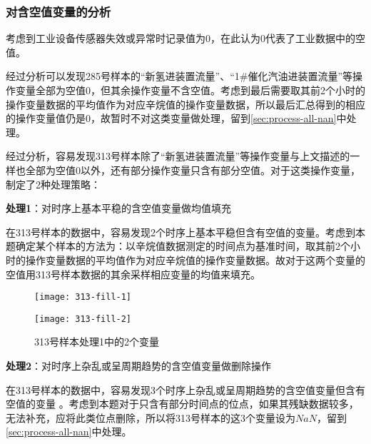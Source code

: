 \documentclass[bwprint]{gmcmthesis}
\begin{document}
%
%


\FloatBarrier
\subsubsection{对含空值变量的分析}\label{sec:empty-analyze}

考虑到工业设备传感器失效或异常时记录值为0，在此认为0代表了工业数据中的空值。

经过分析可以发现285号样本的“新氢进装置流量”、“1\#催化汽油进装置流量”等操作变量全部为空值0，但其余操作变量不含空值。考虑到最后需要取其前2个小时的操作变量数据的平均值作为对应辛烷值的操作变量数据，所以最后汇总得到的相应的操作变量值仍是0，故暂时不对这类变量做处理，留到\ref{sec:process-all-nan}中处理。

经过分析，容易发现313号样本除了“新氢进装置流量”等操作变量与上文描述的一样也全部为空值0以外，还有部分操作变量只含有部分空值。对于这类操作变量，制定了2种处理策略：

\textbf{处理1}：对时序上基本平稳的含空值变量做均值填充

在313号样本的数据中，容易发现2个时序上基本平稳但含有空值的变量。考虑到本题确定某个样本的方法为：以辛烷值数据测定的时间点为基准时间，取其前2个小时的操作变量数据的平均值作为对应辛烷值的操作变量数据。故对于这两个变量的空值用313号样本数据的其余采样相应变量的均值来填充。


\begin{figure}[htb]
    \centering
    \begin{minipage}[c]{0.35\textwidth}
        \centering
        \texttt{[image: 313-fill-1]}
    \end{minipage}
    \begin{minipage}[c]{0.35\textwidth}
        \centering
        \texttt{[image: 313-fill-2]}
    \end{minipage}
    \caption{313号样本处理1中的2个变量}
\end{figure}


\textbf{处理2}：对时序上杂乱或呈周期趋势的含空值变量做删除操作

在313号样本的数据中，容易发现3个时序上杂乱或呈周期趋势的含空值变量但含有空值的变量 。考虑到本题对于只含有部分时间点的位点，如果其残缺数据较多，无法补充，应将此类位点删除，所以将313号样本的这3个变量设为$NaN$，留到\ref{sec:process-all-nan}中处理。
\end{document}
